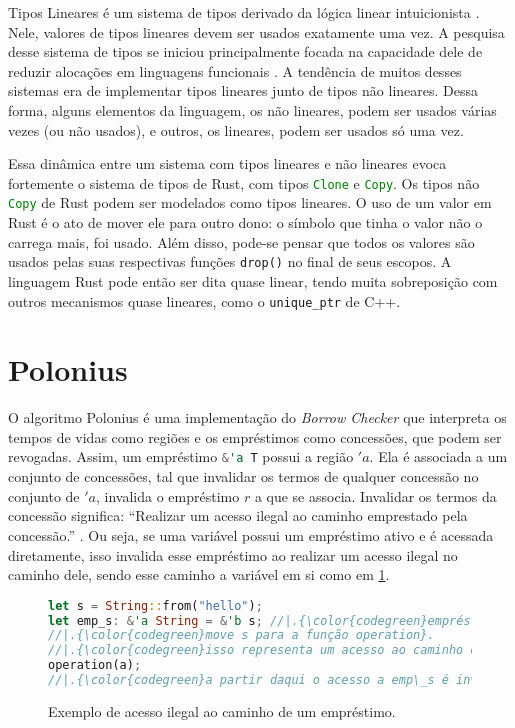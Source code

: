 Tipos Lineares é um sistema de tipos derivado da lógica linear intuicionista \cite{CSLINLOG}. Nele, valores de tipos lineares devem ser usados exatamente uma vez. A pesquisa desse sistema de tipos se iniciou principalmente focada na capacidade dele de reduzir alocações em linguagens funcionais \cite{Wadler1990LinearTC}. A tendência de muitos desses sistemas era de implementar tipos lineares junto de tipos não lineares. Dessa forma, alguns elementos da linguagem, os não lineares, podem ser usados várias vezes (ou não usados), e outros, os lineares, podem ser usados só uma vez. 

Essa dinâmica entre um sistema com tipos lineares e não lineares evoca fortemente o sistema de tipos de Rust, com tipos \lstinline[language=Rust]|Clone| e \lstinline[language=Rust]|Copy|. Os tipos não \lstinline[language=Rust]|Copy| de Rust podem ser modelados como tipos lineares. O uso de um valor em Rust é o ato de mover ele para outro dono: o símbolo que tinha o valor não o carrega mais, foi usado. Além disso, pode-se pensar que todos os valores são usados pelas suas respectivas funções \lstinline[language=Rust]|drop()| no final de seus escopos. A linguagem Rust pode então ser dita quase linear, tendo muita sobreposição com outros mecanismos quase lineares, como o \lstinline[language=C]|unique_ptr| de C++. 

\section{Polonius}
\label{sec:chap4:polonius}


O algoritmo Polonius é uma implementação do \emph{Borrow Checker} que interpreta os tempos de vidas como regiões e os empréstimos como concessões, que podem ser revogadas. Assim, um empréstimo \lstinline[language=Rust]|&'a T| possui a região $'a$. Ela é associada a um conjunto de concessões, tal que invalidar os termos de qualquer concessão no conjunto de $'a$, invalida o empréstimo $r$ a que se associa. Invalidar os termos da concessão significa: ``Realizar um acesso ilegal ao caminho emprestado pela concessão.'' \cite{Matsakis2018}. Ou seja, se uma variável possui um empréstimo ativo e é acessada diretamente, isso invalida esse empréstimo ao realizar um acesso ilegal no caminho dele, sendo esse caminho a variável em si como em \ref{fig:ex:polonius}. 
\begin{figure}[ht]
	\caption{Exemplo de acesso ilegal ao caminho de um empréstimo.}
	\label{fig:ex:polonius}
	\begin{lstlisting}[language=Rust]
let s = String::from("hello");
let emp_s: &'a String = &'b s; //|.{\color{codegreen}empréstimo realizado a s}.
//|.{\color{codegreen}move s para a função operation}.
//|.{\color{codegreen}isso representa um acesso ao caminho de emp\_s, o acesso a s em sí}.
operation(a); 
//|.{\color{codegreen}a partir daqui o acesso a emp\_s é inválido}.
	\end{lstlisting}
\end{figure}

